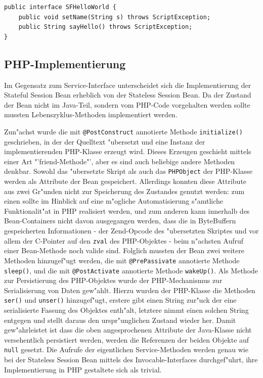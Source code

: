 \begin{lstlisting}[caption=Stateful Hello World Interface]
public interface SFHelloWorld {
    public void setName(String s) throws ScriptException;
    public String sayHello() throws ScriptException;
}
\end{lstlisting}

\subsection{PHP-Implementierung}
\label{sec:chap2:sfsb:impl}

Im Gegensatz zum Service-Interface unterscheidet sich die Implementierung der Stateful Session Bean erheblich von der
Stateless Session Bean. Da der Zustand der Bean nicht im Java-Teil, sondern vom PHP-Code vorgehalten werden sollte
mussten Lebenszyklus-Methoden implementiert werden.

Zun"achst wurde die mit \texttt{@PostConstruct} annotierte Methode \texttt{initialize()} geschrieben, in der der Quelltext
"ubersetzt und eine Instanz der implementierenden PHP-Klasse erzeugt wird. Dieses Erzeugen geschieht mittels einer
Art "'friend-Methode"', aber es sind auch beliebige andere Methoden denkbar.
Sowohl das "ubersetzte Skript als auch das \texttt{PHPObject} der PHP-Klasse werden als Attribute der Bean gespeichert. 
Allerdings konnten diese Attribute aus zwei
Gr"unden nicht zur Speicherung des Zustandes genutzt werden: zum einen sollte im Hinblick auf eine m"ogliche
Automatisierung s"amtliche Funktionalit"at in PHP realisiert werden, und zum anderen kann innerhalb des Bean-Containers
nicht davon ausgegangen werden, dass die in ByteBuffern gespeicherten Informationen - der Zend-Opcode des "ubersetzten
Skriptes und vor allem der C-Pointer auf den \texttt{zval} des PHP-Objektes - beim n"achsten Aufruf einer Bean-Methode noch valide 
sind. Folglich mussten der Bean zwei weitere Methoden hinzugef"ugt werden, die mit \texttt{@PrePassivate} annotierte Methode
\texttt{sleep()}, und die mit \texttt{@PostActivate} annotierte Methode \texttt{wakeUp()}. Als Methode zur Persistierung des
PHP-Objektes wurde der PHP-Mechanismus zur Serialisierung von Daten gew"ahlt. Hierzu wurden der PHP-Klasse die Methoden
\texttt{ser()} und \texttt{unser()} hinzugef"ugt, erstere gibt einen String zur"uck der eine serialisierte Fassung des Objektes
enth"alt, letztere nimmt einen solchen String entgegen und stellt daraus den urspr"unglichen Zustand wieder her.
Damit gew"ahrleistet ist dass die oben angesprochenen Attribute der Java-Klasse nicht versehentlich persistiert werden, 
werden die Referenzen der beiden Objekte auf \texttt{null} gesetzt.
Die Aufrufe der eigentlichen Service-Methoden werden genau wie bei der Stateless Session Bean mittels des Invocable-Interfaces
durchgef"uhrt, ihre Implementierung in PHP gestaltete sich als trivial.

